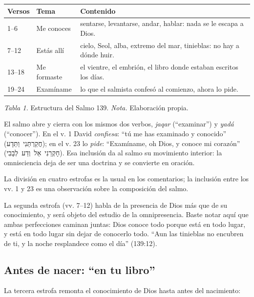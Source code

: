\documentclass[11pt,letterpaper]{article}
\newcommand{\heb}[1]{\mbox{\foreignlanguage{hebrew}{#1}}}
\begin{document}
\begin{center}\small\renewcommand{\arraystretch}{1.25}
\begin{tabular}{@{}L{2.0cm}L{3.0cm}L{9.4cm}@{}}
\toprule
\textbf{Versos} & \textbf{Tema} & \textbf{Contenido} \\ --6 & Me conoces & sentarse, levantarse, andar, hablar: nada se le escapa a Dios. \\
7--12 & Estás allí & cielo, Seol, alba, extremo del mar, tinieblas: no hay a dónde huir. \\
13--18 & Me formaste & el vientre, el embrión, el libro donde estaban escritos los días. \\
19--24 & Examíname & lo que el salmista confesó al comienzo, ahora lo pide. \\
\bottomrule
\end{tabular}\par
{\footnotesize\color{gris}\textit{Tabla 1.} Estructura del Salmo 139. \textit{Nota.} Elaboración propia.}
\end{center}

El salmo abre y cierra con los mismos dos verbos, \emph{jaqar} (``examinar'') y \emph{yadá} (``conocer''). En el v. 1 David \emph{confiesa}: ``tú me has examinado y conocido'' (\heb{חֲקַרְתַּנִי וַתֵּדָע}); en el v. 23 lo \emph{pide}: ``Examíname, oh Dios, y conoce mi corazón'' (\heb{חָקְרֵנִי אֵל וְדַע לְבָבִי}). Esa inclusión da al salmo su movimiento interior: la omnisciencia deja de ser una doctrina y se convierte en oración.

\begin{nota}[Precisión]
La división en cuatro estrofas es la usual en los comentarios; la inclusión entre los vv. 1 y 23 es una observación sobre la composición del salmo.
\end{nota}

La segunda estrofa (vv. 7--12) habla de la presencia de Dios más que de su conocimiento, y será objeto del estudio de la omnipresencia. Baste notar aquí que ambas perfecciones caminan juntas: Dios conoce todo porque está en todo lugar, y está en todo lugar sin dejar de conocerlo todo. ``Aun las tinieblas no encubren de ti, y la noche resplandece como el día'' (139:12).

\subsection{Antes de nacer: ``en tu libro''}
La tercera estrofa remonta el conocimiento de Dios hasta antes del nacimiento:
\end{document}
